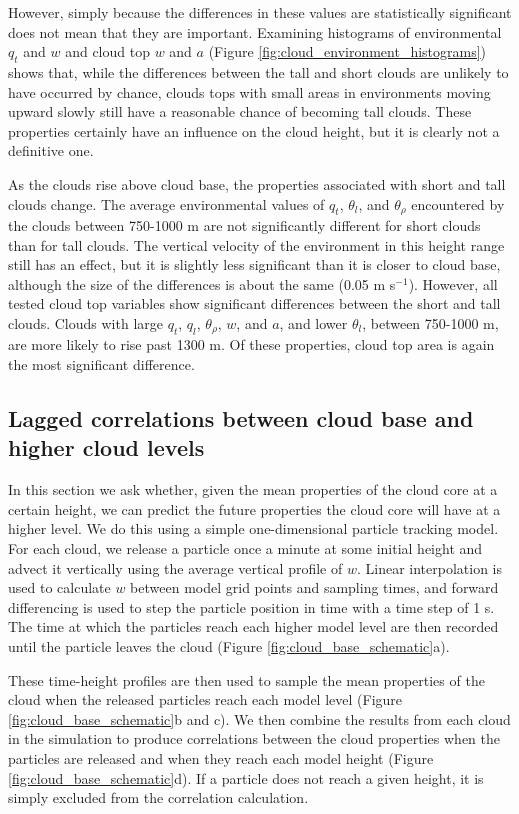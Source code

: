 \documentclass[acp]{copernicus}
\begin{document}
However, simply because the differences in these values are statistically 
significant does not mean that they are important.  Examining histograms of 
environmental $q_t$ and $w$ and cloud top $w$ and $a$ (Figure 
\ref{fig:cloud_environment_histograms}) shows that, while the differences 
between the tall and short clouds are unlikely to have occurred by chance, 
clouds tops with small areas in environments moving upward slowly still have 
a reasonable chance of becoming tall clouds.  These properties certainly have 
an influence on the cloud height, but it is clearly not a definitive one.

As the clouds rise above cloud base, the properties associated with short and 
tall clouds change.  The average environmental values of $q_t$, $\theta_l$, 
and $\theta_\rho$ encountered by the clouds between 750-1000 m are not 
significantly different for short clouds than for tall clouds.  The vertical 
velocity of the environment in this height range still has an effect, but it 
is slightly less significant than it is closer to cloud base, although the 
size of the differences is about the same (0.05 m s$^{-1}$).  However, all 
tested cloud top variables show significant differences between the short and 
tall clouds.  Clouds with large $q_t$, $q_l$, $\theta_\rho$, $w$, and $a$, and 
lower $\theta_l$, between 750-1000 m, are more likely to rise past 1300 m.  
Of these properties, cloud top area is again the most significant difference.

\subsection{Lagged correlations between cloud base and higher cloud levels}

In this section we ask whether, given the mean properties of the cloud core at 
a certain height, we can predict the future properties the cloud core will have 
at a higher level.  We do this using a simple one-dimensional particle tracking 
model.  For each cloud, we release a particle once a minute at some
initial height and advect it vertically using the average vertical profile of 
$w$.  Linear interpolation is used to calculate $w$ between model grid points 
and sampling times, and forward differencing is used to step the particle 
position in time with a time step of 1 s.  The time at which the particles 
reach each higher model level are then recorded until the particle leaves the 
cloud (Figure \ref{fig:cloud_base_schematic}a).  

These time-height profiles are then used to sample the mean properties of the 
cloud when the released particles reach each model level (Figure 
\ref{fig:cloud_base_schematic}b and c).  We then combine the results from each 
cloud in the simulation to produce correlations between the cloud properties 
when the particles are released and when they reach each model height (Figure 
\ref{fig:cloud_base_schematic}d).  If a particle does not reach a given
height, it is simply excluded from the correlation calculation.
\end{document}
